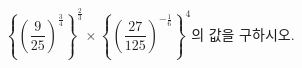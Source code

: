 $\left\{\left(\dfrac{9}{25}\right)^{\frac{3}{4}}\right\}^{\frac{2}{3}}\times\left\{\left(\dfrac{27}{125}\right)^{-\frac{1}{6}}\right\}^{4}$의 값을 구하시오.
